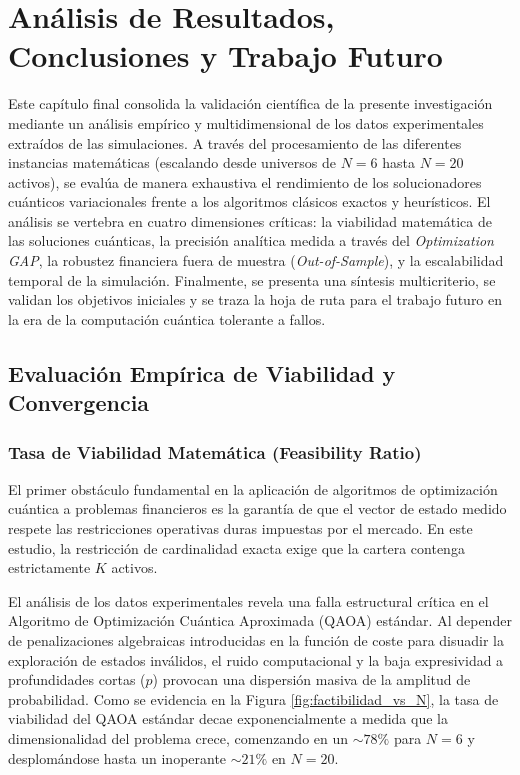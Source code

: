 \chapter{Análisis de Resultados, Conclusiones y Trabajo Futuro}
\label{ch:analisis_resultados_conclusiones}

Este capítulo final consolida la validación científica de la presente investigación mediante un análisis empírico y multidimensional de los datos experimentales extraídos de las simulaciones. A través del procesamiento de las diferentes instancias matemáticas (escalando desde universos de $N=6$ hasta $N=20$ activos), se evalúa de manera exhaustiva el rendimiento de los solucionadores cuánticos variacionales frente a los algoritmos clásicos exactos y heurísticos. El análisis se vertebra en cuatro dimensiones críticas: la viabilidad matemática de las soluciones cuánticas, la precisión analítica medida a través del \textit{Optimization GAP}, la robustez financiera fuera de muestra (\textit{Out-of-Sample}), y la escalabilidad temporal de la simulación. Finalmente, se presenta una síntesis multicriterio, se validan los objetivos iniciales y se traza la hoja de ruta para el trabajo futuro en la era de la computación cuántica tolerante a fallos.

\section{Evaluación Empírica de Viabilidad y Convergencia}
\label{sec:evaluacion_viabilidad_convergencia}

\subsection{Tasa de Viabilidad Matemática (Feasibility Ratio)}
El primer obstáculo fundamental en la aplicación de algoritmos de optimización cuántica a problemas financieros es la garantía de que el vector de estado medido respete las restricciones operativas duras impuestas por el mercado. En este estudio, la restricción de cardinalidad exacta exige que la cartera contenga estrictamente $K$ activos. 

El análisis de los datos experimentales revela una falla estructural crítica en el Algoritmo de Optimización Cuántica Aproximada (QAOA) estándar. Al depender de penalizaciones algebraicas introducidas en la función de coste para disuadir la exploración de estados inválidos, el ruido computacional y la baja expresividad a profundidades cortas ($p$) provocan una dispersión masiva de la amplitud de probabilidad. Como se evidencia en la Figura \ref{fig:factibilidad_vs_N}, la tasa de viabilidad del QAOA estándar decae exponencialmente a medida que la dimensionalidad del problema crece, comenzando en un $\sim78\%$ para $N=6$ y desplomándose hasta un inoperante $\sim21\%$ en $N=20$. 

